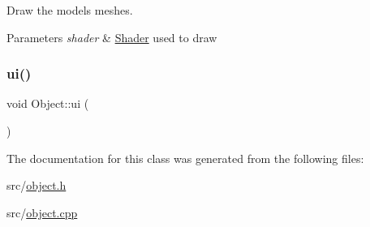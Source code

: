 Draw the model\textquotesingle{}s meshes. 


\begin{DoxyParams}{Parameters}
{\em shader} & \hyperlink{classShader}{Shader} used to draw \\
\hline
\end{DoxyParams}
\mbox{\label{classObject_a0a9d6c7d2325fc1eb7e5854151a51d09}} 
\subsubsection{\texorpdfstring{ui()}{ui()}}
{\footnotesize\ttfamily void Object\+::ui (\begin{DoxyParamCaption}{ }\end{DoxyParamCaption})}



The documentation for this class was generated from the following files\+:\begin{DoxyCompactItemize}
\item 
src/\hyperlink{object_8h}{object.\+h}\item 
src/\hyperlink{object_8cpp}{object.\+cpp}\end{DoxyCompactItemize}
